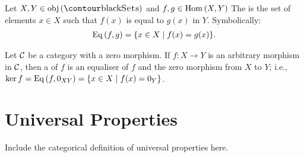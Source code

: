    \begin{definition}
        Let $X,Y \in \obj{(\cSets)}$ and $f,g \in \operatorname{Hom}{(X,Y)}$ The  is the set of elements $x \in X$ such that $f(x)$ is equal to $g(x)$ in $Y$. Symbolically:
            \begin{equation*}
            \begin{split}
                \operatorname{Eq}{(f,g)} = \{x \in X \mid f(x) = g(x) \}.
            \end{split}
            \end{equation*}
    \end{definition}

    \begin{definition}\label{def:category-kernels}
        Let $\mathcal{C}$ be a category with a zero morphism. If $f:X \rightarrow Y$ is an arbitrary morphism in $\mathcal{C}$, then a  of $f$ is an equaliser of $f$ and the zero morphism from $X$ to $Y$; i.e., $\ker{f} = \operatorname{Eq}{(f,0_{XY})} = \{x \in X \mid f(x) = 0_Y\}$.
    \end{definition}

\section{Universal Properties}

    \begin{definition}
        Include the categorical definition of universal properties here.
    \end{definition}

